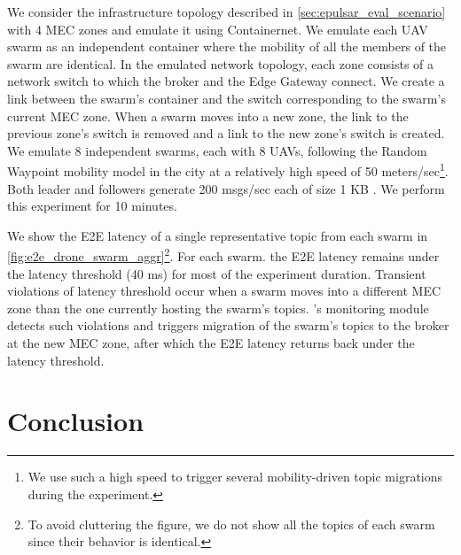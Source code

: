We consider the infrastructure topology described in \cref{sec:epulsar_eval_scenario} with 4 MEC zones and emulate it using Containernet. We emulate each UAV swarm as an independent container where the mobility of all the members of the swarm are identical. In the emulated network topology, each zone consists of a network switch to which the broker and the Edge Gateway connect. We create a link between the swarm's container and the switch corresponding to the swarm's current MEC zone. When a swarm moves into a new zone, the link to the previous zone's switch is removed and a link to the new zone's switch is created. We emulate 8 independent swarms, each with 8 UAVs, following the Random Waypoint mobility model in the city at a relatively high speed of 50 meters/sec\footnote{We use such a high speed to trigger several mobility-driven topic migrations during the experiment.}. Both leader and followers generate 200 msgs/sec each of size 1 KB \cite{yang2018telecom}. We perform this experiment for 10 minutes.
\par We show the E2E latency of a single representative topic from each swarm in \cref{fig:e2e_drone_swarm_aggr}\footnote{To avoid cluttering the figure, we do not show all the topics of each swarm since their behavior is identical.}.
For each swarm. the E2E latency remains under the latency threshold  (40 ms) for most of the experiment duration. Transient violations of latency threshold occur when a swarm moves into a different MEC zone than the one currently hosting the swarm's topics. \epulsar{}'s monitoring module detects such violations and triggers migration of the swarm's topics to the broker at the new MEC zone, after which the E2E latency returns back under the latency threshold.

\section{Conclusion}
\label{sec:epulsar_conclusion}